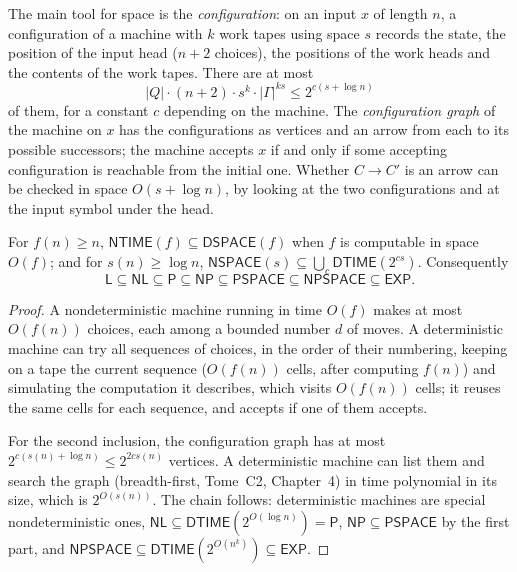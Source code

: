 The main tool for space is the \emph{configuration}: on an input $x$ of length $n$, a configuration of a machine with $k$ work tapes using space $s$ records the state, the position of the input head ($n+2$ choices), the positions of the work heads and the contents of the work tapes. There are at most
\begin{equation}\label{eq:configs}
|Q|\cdot(n+2)\cdot s^k\cdot|\Gamma|^{ks}\le2^{c(s+\log n)}
\end{equation}
of them, for a constant $c$ depending on the machine. The \emph{configuration graph} of the machine on $x$ has the configurations as vertices and an arrow from each to its possible successors; the machine accepts $x$ if and only if some accepting configuration is reachable from the initial one. Whether $C\to C'$ is an arrow can be checked in space $O(s+\log n)$, by looking at the two configurations and at the input symbol under the head.

\begin{proposition}\label{prop:inclusions}
For $f(n)\ge n$, $\mathsf{NTIME}(f)\subseteq\mathsf{DSPACE}(f)$ when $f$ is computable in space $O(f)$; and for $s(n)\ge\log n$, $\mathsf{NSPACE}(s)\subseteq\bigcup_c\mathsf{DTIME}(2^{cs})$. Consequently
\[
\mathsf L\subseteq\mathsf{NL}\subseteq\mathsf P\subseteq\mathsf{NP}\subseteq\mathsf{PSPACE}\subseteq\mathsf{NPSPACE}\subseteq\mathsf{EXP}.
\]
\end{proposition}

\begin{proof}
A nondeterministic machine running in time $O(f)$ makes at most $O(f(n))$ choices, each among a bounded number $d$ of moves. A deterministic machine can try all sequences of choices, in the order of their numbering, keeping on a tape the current sequence ($O(f(n))$ cells, after computing $f(n)$) and simulating the computation it describes, which visits $O(f(n))$ cells; it reuses the same cells for each sequence, and accepts if one of them accepts.

For the second inclusion, the configuration graph has at most $2^{c(s(n)+\log n)}\le2^{2cs(n)}$ vertices. A deterministic machine can list them and search the graph (breadth-first, Tome~C2, Chapter~4) in time polynomial in its size, which is $2^{O(s(n))}$. The chain follows: deterministic machines are special nondeterministic ones, $\mathsf{NL}\subseteq\mathsf{DTIME}(2^{O(\log n)})=\mathsf P$, $\mathsf{NP}\subseteq\mathsf{PSPACE}$ by the first part, and $\mathsf{NPSPACE}\subseteq\mathsf{DTIME}(2^{O(n^k)})\subseteq\mathsf{EXP}$.
\end{proof}

